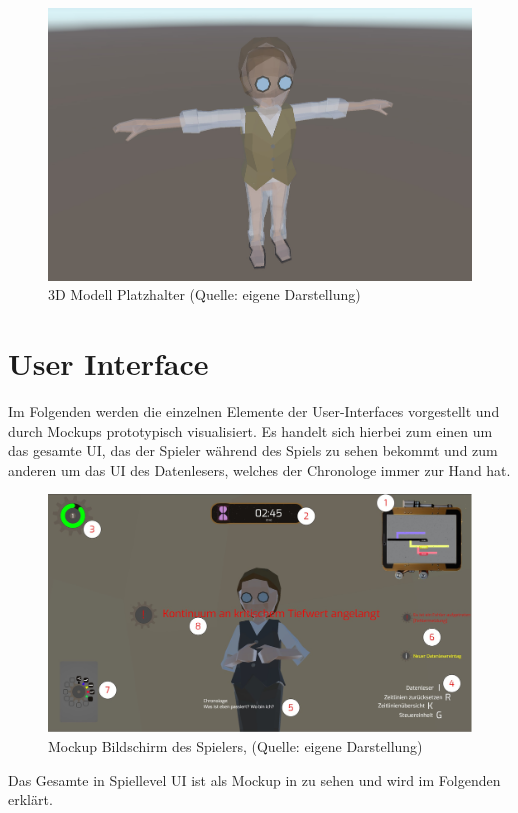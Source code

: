 \begin{figure}[ht]
\centering
\includegraphics[width=0.8\linewidth]{content/pictures/Ghost.jpg}
\caption{3D Modell Platzhalter (Quelle: eigene Darstellung)}
\label{fig:ghost}
\end{figure}
\newpage
\section{User Interface}\label{sec:user-interface}
Im Folgenden werden die einzelnen Elemente der User-Interfaces vorgestellt und durch Mockups prototypisch visualisiert. Es handelt sich hierbei zum einen um das gesamte \ac{UI}, das der Spieler während des Spiels zu sehen bekommt und zum anderen um das \ac{UI} des Datenlesers, welches der Chronologe immer zur Hand hat.

\begin{figure}[ht]
\centering
\includegraphics[width=1\linewidth]{content/pictures/UI.jpg}
\caption{Mockup Bildschirm des Spielers, (Quelle: eigene Darstellung)}
\label{fig:ui-player}
\end{figure}

Das Gesamte in Spiellevel \ac{UI} ist als Mockup in  zu sehen und wird im Folgenden erklärt.

